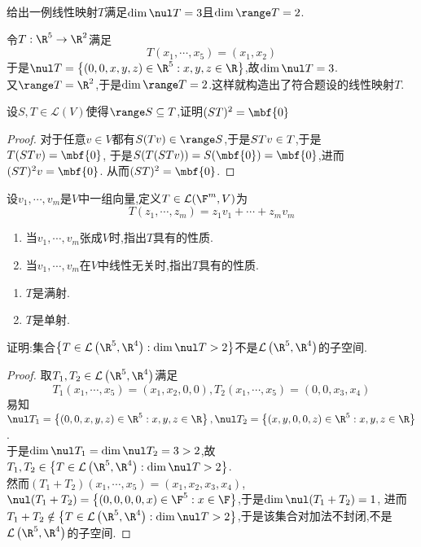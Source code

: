 \documentclass{ctexart}
\begin{document}
\pagestyle{empty}
\begin{problem}[1.]
    给出一例线性映射$T$满足$\dim\nul T=3$且$\dim\range T=2$.
\end{problem}
\begin{solution}[Solution.]
    令$T:\R^5\to\R^2$满足
    $$T(x_1,\cdots,x_5)=(x_1,x_2)$$
    于是$\nul T=\left\{(0,0,x,y,z)\in\R^5:x,y,z\in\R\right\}$,故$\dim\nul T=3$.\\
    又$\range T=\R^2$,于是$\dim\range T=2$.这样就构造出了符合题设的线性映射$T$.
\end{solution}
\begin{problem}[2.]
    设$S,T\in\mathcal{L}(V)$使得$\range S\subseteq\null T$,证明$(ST)^2=\mbf{0}$
\end{problem}
\begin{proof}
    对于任意$v\in V$都有$S(Tv)\in\range S$,于是$STv\in\null T$,于是$T(STv)=\mbf{0}$,
    于是$S(T(STv))=S(\mbf{0})=\mbf{0}$,进而$(ST)^2v=\mbf{0}$.
    从而$(ST)^2=\mbf{0}$.
\end{proof}
\begin{problem}[3.]
    设$v_1,\cdots,v_m$是$V$中一组向量,定义$T\in\mathcal{L}(\F^m,V)$为
    $$T(z_1,\cdots,z_m)=z_1v_1+\cdots+z_mv_m$$
    \begin{enumerate}[label=\tbf{(\arabic*)}]
        \item 当$v_1,\cdots,v_m$张成$V$时,指出$T$具有的性质.
        \item 当$v_1,\cdots,v_m$在$V$中线性无关时,指出$T$具有的性质.
    \end{enumerate}
\end{problem}
\begin{solution}[Solution.]
    \begin{enumerate}[label=\tbf{(\arabic*)}]
        \item $T$是满射.
        \item $T$是单射.
    \end{enumerate}
\end{solution}
\begin{problem}[4.]
    证明:集合$\left\{T\in\mathcal{L}\left(\R^5,\R^4\right):\dim\nul T>2\right\}$不是$\mathcal{L}\left(\R^5,\R^4\right)$的子空间.
\end{problem}
\begin{proof}
    取$T_1,T_2\in\mathcal{L}\left(\R^5,\R^4\right)$满足
    $$T_1(x_1,\cdots,x_5)=(x_1,x_2,0,0),T_2(x_1,\cdots,x_5)=(0,0,x_3,x_4)$$
    易知$\nul T_1=\left\{(0,0,x,y,z)\in\R^5:x,y,z\in\R\right\},\nul T_2=\left\{(x,y,0,0,z)\in\R^5:x,y,z\in\R\right\}$.\\
    于是$\dim\nul T_1=\dim\nul T_2=3>2$,故$T_1,T_2\in\left\{T\in\mathcal{L}\left(\R^5,\R^4\right):\dim\nul T>2\right\}$.\\
    然而$(T_1+T_2)(x_1,\cdots,x_5)=(x_1,x_2,x_3,x_4)$,$\nul(T_1+T_2)=\left\{(0,0,0,0,x)\in\F^5:x\in\F\right\}$,于是$\dim\nul (T_1+T_2)=1$,
    进而$T_1+T_2\notin\left\{T\in\mathcal{L}\left(\R^5,\R^4\right):\dim\nul T>2\right\}$,于是该集合对加法不封闭,不是$\mathcal{L}\left(\R^5,\R^4\right)$的子空间.
\end{proof}
\end{document}
